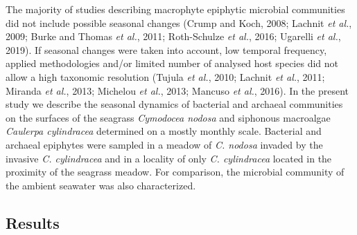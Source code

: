 \documentclass[12pt,]{article}
\begin{document}
The majority of studies describing macrophyte epiphytic microbial
communities did not include possible seasonal changes (Crump and Koch,
2008; Lachnit \emph{et al.}, 2009; Burke and Thomas \emph{et al.}, 2011;
Roth-Schulze \emph{et al.}, 2016; Ugarelli \emph{et al.}, 2019). If
seasonal changes were taken into account, low temporal frequency,
applied methodologies and/or limited number of analysed host species did
not allow a high taxonomic resolution (Tujula \emph{et al.}, 2010;
Lachnit \emph{et al.}, 2011; Miranda \emph{et al.}, 2013; Michelou
\emph{et al.}, 2013; Mancuso \emph{et al.}, 2016). In the present study
we describe the seasonal dynamics of bacterial and archaeal communities
on the surfaces of the seagrass \emph{Cymodocea nodosa} and siphonous
macroalgae \emph{Caulerpa cylindracea} determined on a mostly monthly
scale. Bacterial and archaeal epiphytes were sampled in a meadow of
\emph{C. nodosa} invaded by the invasive \emph{C. cylindracea} and in a
locality of only \emph{C. cylindracea} located in the proximity of the
seagrass meadow. For comparison, the microbial community of the ambient
seawater was also characterized.

\newpage

\hypertarget{results}{%
\subsection{Results}\label{results}}
\end{document}
